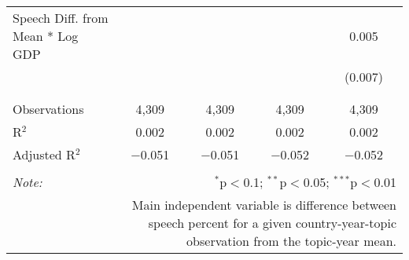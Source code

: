 \begin{table}[!htbp]
\begin{tabular}{@{\extracolsep{5pt}}lcccc}
 Speech Diff. from Mean * Log GDP &  &  &  & 0.005 \\ 
  &  &  &  & (0.007) \\ 
  & & & & \\ 
\hline \\[-1.8ex] 
Observations & 4,309 & 4,309 & 4,309 & 4,309 \\ 
R$^{2}$ & 0.002 & 0.002 & 0.002 & 0.002 \\ 
Adjusted R$^{2}$ & $-$0.051 & $-$0.051 & $-$0.052 & $-$0.052 \\ 
\hline 
\hline \\[-1.8ex] 
\textit{Note:}  & \multicolumn{4}{r}{$^{*}$p$<$0.1; $^{**}$p$<$0.05; $^{***}$p$<$0.01} \\ 
 & \multicolumn{4}{r}{Main independent variable is difference between speech percent for a given country-year-topic observation from the topic-year mean.} \\ 
\end{tabular} 
\end{table} 
